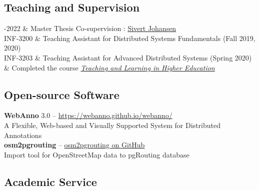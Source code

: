 \documentclass[11pt, a4paper]{article}
\newcommand{\LastName}{Sharma}
\newcommand{\Initials}{A}
\newcommand{\Me}{\textbf{\LastName, \Initials}}  %
\newcommand{\DOI}[1]{doi:\href{https://doi.org/#1}{#1}}
\newcommand{\Year}[1]{\fontsize{10pt}{0}\selectfont #1}
\begin{document}
\iffalse

\subsection*{Open Datasets}

\begin{EntriesTable}
\Year{2017}  &
    \Me, \Val.
    A gravity-derived Moho model for South America: source code, data, and
    model results from ``Fast non-linear gravity inversion in spherical
    coordinates with application to the South American Moho''.
    \DOI{10.6084/m9.figshare.3987267}
\end{EntriesTable}

\fi



\subsection*{Teaching and Supervision}

\begin{EntriesTable}
	\Year{2021-2022} &
	Master Thesis Co-supervision : \href{https://munin.uit.no/handle/10037/25929}{Sivert Johansen} 
	\\
	\Year{INF-3200} &
	Teaching Assistant for Distributed Systems Fundamentals (Fall 2019, 2020)
	\\
	\Year{INF-3203} &
	Teaching Assistant for Advanced Distributed Systems (Spring 2020)
	\\
	\Year{2020} & 
	Completed the course \href{https://result.uit.no/phd-course/}{\textit{Teaching and Learning in Higher Education}} 
\end{EntriesTable}

\subsection*{Open-source Software}
\textbf{WebAnno} 3.0 -- \href{https://webanno.github.io/webanno/}{https://webanno.github.io/webanno/}
\\
A Flexible, Web-based and Visually Supported System for Distributed Annotations
\\
\textbf{osm2pgrouting} -- \href{https://github.com/pgRouting/osm2pgrouting/blob/main/AUTHORS.md}{osm2pgrouting on GitHub}
\\
Import tool for OpenStreetMap data to pgRouting database


\subsection*{Academic Service}
\end{document}
